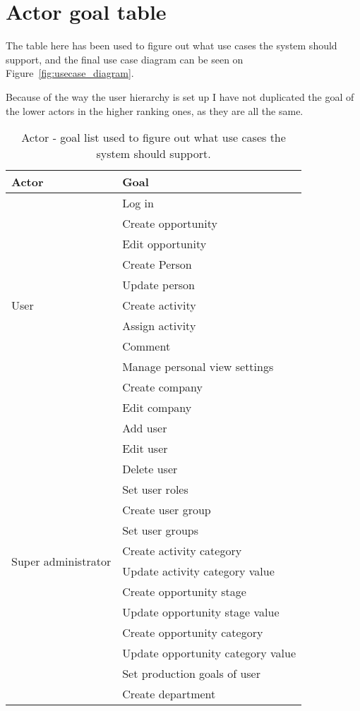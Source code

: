 \chapter{Actor goal table}
\label{app:actor-goal}
The table here has been used to figure out what use cases the system should support, and the final use case diagram can be seen on Figure~\ref{fig:usecase_diagram}.

Because of the way the user hierarchy is set up I have not duplicated the goal of the lower actors in the higher ranking ones, as they are all the same.

\begin{table}[h]
  \begin{tabular}{l|l}
    Actor & Goal \\ \hline
    \multirow{11}{*}{User}
    & Log in \\
    & Create opportunity \\
    & Edit opportunity \\
    & Create Person \\
    & Update person \\
    & Create activity \\
    & Assign activity \\
    & Comment \\
    & Manage personal view settings \\
    & Create company \\
    & Edit company \\
    \hline
    \multirow{14}{*}{Super administrator}
    & Add user \\
    & Edit user \\
    & Delete user \\
    & Set user roles \\
    & Create user group \\
    & Set user groups \\
    & Create activity category \\
    & Update activity category value \\
    & Create opportunity stage \\
    & Update opportunity stage value \\
    & Create opportunity category \\
    & Update opportunity category value \\
    & Set production goals of user \\
    & Create department
  \end{tabular}
  \caption{Actor - goal list used to figure out what use cases the system should support.}
  \label{tab:actor-loal-list}
\end{table}

